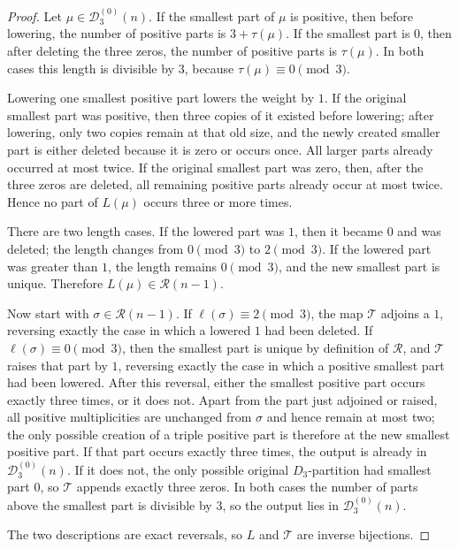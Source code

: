 \documentclass[11pt]{amsart}
\theoremstyle{definition}
\theoremstyle{remark}
\newcommand{\D}{\mathcal D}
\newcommand{\R}{\mathcal R}
\begin{document}
\begin{proof}
Let $\mu\in\D_3^{(0)}(n)$.  If the smallest part of $\mu$ is positive, then before lowering, the number of positive parts is $3+\tau(\mu)$.  If the smallest part is $0$, then after deleting the three zeros, the number of positive parts is $\tau(\mu)$.  In both cases this length is divisible by $3$, because $\tau(\mu)\equiv0\pmod3$.

Lowering one smallest positive part lowers the weight by $1$.  If the original smallest part was positive, then three copies of it existed before lowering; after lowering, only two copies remain at that old size, and the newly created smaller part is either deleted because it is zero or occurs once.  All larger parts already occurred at most twice.  If the original smallest part was zero, then, after the three zeros are deleted, all remaining positive parts already occur at most twice.  Hence no part of $L(\mu)$ occurs three or more times.

There are two length cases.  If the lowered part was $1$, then it became $0$ and was deleted; the length changes from $0\pmod3$ to $2\pmod3$.  If the lowered part was greater than $1$, the length remains $0\pmod3$, and the new smallest part is unique.  Therefore $L(\mu)\in\R(n-1)$.

Now start with $\sigma\in\R(n-1)$.  If $\ell(\sigma)\equiv2\pmod3$, the map $\mathcal T$ adjoins a $1$, reversing exactly the case in which a lowered $1$ had been deleted.  If $\ell(\sigma)\equiv0\pmod3$, then the smallest part is unique by definition of $\R$, and $\mathcal T$ raises that part by $1$, reversing exactly the case in which a positive smallest part had been lowered.  After this reversal, either the smallest positive part occurs exactly three times, or it does not.  Apart from the part just adjoined or raised, all positive multiplicities are unchanged from $\sigma$ and hence remain at most two; the only possible creation of a triple positive part is therefore at the new smallest positive part.  If that part occurs exactly three times, the output is already in $\D_3^{(0)}(n)$.  If it does not, the only possible original $D_3$-partition had smallest part $0$, so $\mathcal T$ appends exactly three zeros.  In both cases the number of parts above the smallest part is divisible by $3$, so the output lies in $\D_3^{(0)}(n)$.

The two descriptions are exact reversals, so $L$ and $\mathcal T$ are inverse bijections.
\end{proof}
\end{document}
